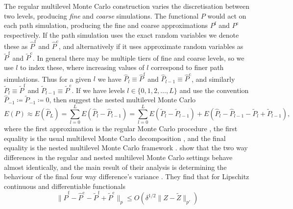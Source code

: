 \documentclass[9pt,a4paper,english]{extarticle}
\begin{document}
The regular multilevel Monte Carlo construction varies the discretisation between two levels, producing \emph{fine} and \emph{coarse} simulations. The functional $ P $ would act on each path simulation, producing the fine and coarse approximations $ P^{\mathrm{f}} $ and $ P^{\mathrm{c}} $ respectively. If the path simulation uses the exact random variables we denote these as $ \widehat{P}^{\mathrm{f}} $ and $ \widehat{P}^{\mathrm{c}} $, and alternatively if it uses approximate random variables as $ \widetilde{P}^{\mathrm{f}} $ and $ \widetilde{P}^{\mathrm{c}} $. In general there may be multiple tiers of fine and coarse levels, so we use $ l $ to index these, where increasing values of $ l $ correspond to finer path simulations. Thus for a given $ l $ we have $ \widehat{P}_l \equiv \widehat{P}^{\mathrm{f}} $ and $ \widehat{P}_{l-1} \equiv \widehat{P}^{\mathrm{c}} $, and similarly $ \widetilde{P}_l \equiv \widetilde{P}^{\mathrm{f}} $ and $ \widetilde{P}_{l-1} \equiv \widetilde{P}^{\mathrm{c}} $. If we have levels $ l \in \{0, 1, 2, \ldots, L\} $ and use the convention $ \widehat{P}_{-1} \coloneqq \widetilde{P}_{-1} \coloneqq 0 $, then \citet{giles2020approximate} suggest the nested multilevel Monte Carlo
\begin{equation*}
E(P) 
\approx
E(\widehat{P}_L) 
= 
\sum_{l = 0}^{L} E(\widehat{P}_l - \widehat{P}_{l-1}) 
= 
\sum_{l = 0}^{L} E(\widetilde{P}_l - \widetilde{P}_{l-1}) +  E(\widehat{P}_l - \widehat{P}_{l-1} - \widetilde{P}_l + \widetilde{P}_{l-1}),
\end{equation*}
where the first approximation is the regular Monte Carlo procedure \citep{glasserman2013monte}, the first equality is the usual multilevel Monte Carlo decomposition \citep{giles2008multilevel}, and the final equality is the nested multilevel Monte Carlo framework \citep{giles2020approximate,sheridan2020nested}.
\citeauthor{giles2020approximate} \citep{giles2020approximate,sheridan2020nested} show that the two way differences in the regular and nested multilevel Monte Carlo settings behave almost identically, and the main result of their analysis is determining the behaviour of the final four way difference's variance \citep[lemmas~4.10 and 4.11]{giles2020approximate} \citep[corollaries~6.2.6.2 and 6.2.6.3]{sheridan2020nested}. They find that for Lipschitz continuous and differentiable functionals
\begin{equation*}
\lVert \widehat{P}^{\mathrm{f}} - \widehat{P}^{\mathrm{c}} - \widetilde{P}^{\mathrm{f}} + \widetilde{P}^{\mathrm{c}}\rVert_p 
\leq O(\delta^{1/2} \lVert Z - \widetilde{Z} \rVert_{p'}) 
\end{equation*}
\end{document}
